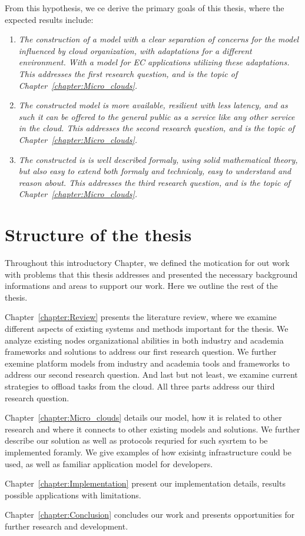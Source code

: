 From this hypothesis, we ce derive the primary goals of this thesis, where the expected results include:

\begin{enumerate}[start=1,label={(\bfseries \arabic*)}]
	\item \textit{The construction of a model with a clear separation of concerns for the model influenced by cloud organization, with adaptations for a different environment. With a model for EC applications utilizing these adaptations. This addresses the first research question, and is the topic of Chapter~\ref{chapter:Micro_clouds}.}
	\item \textit{The constructed model is more available, resilient with less latency, and as such it can be offered to the general public as a service like any other service in the cloud. This addresses the second research question, and is the topic of Chapter~\ref{chapter:Micro_clouds}.}
	\item \textit{The constructed is is well described formaly, using solid mathematical theory, but also easy to extend both formaly and technicaly, easy to understand and reason about. This addresses the third research question, and is the topic of Chapter~\ref{chapter:Micro_clouds}.}
\end{enumerate}
%
%
\section{Structure of the thesis}\label{sec:structure_of_thesis}
%
Throughout this introductory Chapter, we defined the motication for out work with problems that this thesis addresses and presented the necessary background informations and areas to support our work. Here we outline the rest of the thesis.

Chapter~\ref{chapter:Review} presents the literature review, where we examine different aspects of existing systems and methods important for the thesis. We analyze existing nodes organizational abilities in both industry and academia frameworks and solutions to address our first research question. We further exemine platform models from industry and academia tools and frameworks to address our second research question. And last but not least, we examine current strategies to offload tasks from the cloud. All three parts address our third research question.

Chapter~\ref{chapter:Micro_clouds} details our model, how it is related to other research and where it connects to other existing models and solutions. We further describe our solution as well as protocols requried for such sysrtem to be implemented foramly. We give examples of how exisintg infrastructure could be used, as well as familiar application model for developers. 

Chapter~\ref{chapter:Implementation} present our implementation details, results possible applications with limitations.

Chapter~\ref{chapter:Conclusion} concludes our work and presents opportunities for further research and development.
%
%